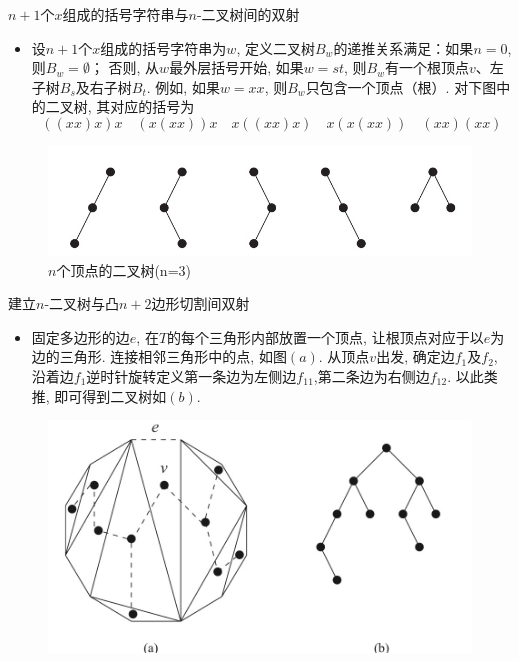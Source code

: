 \documentclass[punct]{beamer}
\begin{document}
\begin{frame}{$n+1$个$x$组成的括号字符串与$n$-二叉树间的双射}
    \begin{itemize}
        \item 设$n+1$个$x$组成的括号字符串为$w$, 定义二叉树$B_w$的递推关系满足：如果$n=0$,则$B_w=\emptyset$；
        否则, 从$w$最外层括号开始, 如果$w=st$, 则$B_w$有一个根顶点$v$、左子树$B_s$及右子树$B_t$.
        例如, 如果$w=xx$, 则$B_w$只包含一个顶点（根）. 对下图中的二叉树, 其对应的括号为
        \[
        ((xx)x)x \quad (x(xx))x \quad x((xx)x)\quad x(x(xx)) \quad (xx)(xx)
        \]
    \end{itemize}
    \begin{figure}[h]
        \centering
        \includegraphics[width=0.6\linewidth]{binary-trees.jpg}
        \caption{$n$个顶点的二叉树(n=3)}
    \end{figure}
\end{frame}



\begin{frame}{建立$n$-二叉树与凸$n+2$边形切割间双射}
	\begin{itemize}
		\item 固定多边形的边$e$, 在$T$的每个三角形内部放置一个顶点, 让根顶点对应于以$e$为边的三角形.
		连接相邻三角形中的点, 如图$(a)$. 从顶点$v$出发, 确定边$f_1$及$f_2$, 沿着边$f_1$逆时针旋转定义第一条边为左侧边$f_{11}$,第二条边为右侧边$f_{12}$.
		以此类推, 即可得到二叉树如$(b)$.
	\end{itemize}
	\begin{figure}[h]
		\centering
		\includegraphics[width=0.6\linewidth]{triangulationsT-b.jpg}
	\end{figure}
\end{frame}

\end{document}
